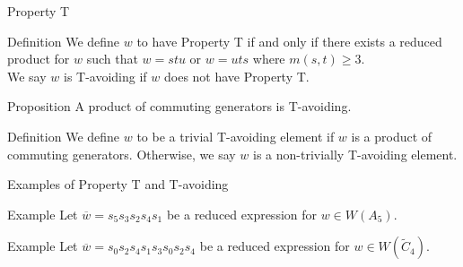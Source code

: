 \documentclass{beamer}
\newcommand{\w}{\overline{w}}
\newcommand{\C}{\widetilde{C}}
\newcommand\heapblock[4]{\fill[fill=#4, fill opacity=0.35, draw=#4, line width=1.1pt, rounded corners,shift={(\xxaxis:#1)},shift={(\yyaxis:#2)}] (-1,-1) rectangle (1,1);\node at (#1,#2) {\footnotesize $#3$};}
\newcommand\xxaxis{0}
\newcommand\yyaxis{90}
\begin{document}

\begin{frame}{Property T}
	\begin{block}{Definition}
	We define $w$ to have \alert{Property T} if and only if there exists a reduced product for $w$ such that $w=stu$ or $w=uts$ where $m(s,t) \geq 3$.\\ \pause 
	\vspace{1em}
	We say $w$ is \alert{T-avoiding} if $w$ does not have Property T.
	\end{block}

\begin{block}{Proposition}
A product of commuting generators is T-avoiding.	
\end{block}

\begin{block}{Definition}
	We define $w$ to be a \alert{trivial T-avoiding} element if $w$ is a product of commuting generators. Otherwise, we say $w$ is a \alert{non-trivially T-avoiding} element.
\end{block}

\end{frame}




\begin{frame}{Examples of Property T and T-avoiding}

\begin{block}{Example}
Let $\w=s_5s_3s_2s_4s_1$ be a reduced expression for $w \in W(A_5)$. 
\pause
\begin{figure}
\end{figure}
\end{block}

\pause

\begin{block}{Example}
Let $\w=s_0s_2s_4s_1s_3s_0s_2s_4$ be a reduced expression for $w \in W(\C_4)$.
\begin{figure}
\end{figure}
\end{block}

\end{frame}
\end{document}
